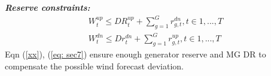\textbf{\emph{Reserve constraints:} }
\begin{align}
W^{up}_t \leq DR^{up}_t + \sum_{g=1}^{G} r_{g,t}^{dn}, t\in{1,...,T} \label{xx} \\
W^{dn}_t \leq Dr^{dn}_t + \sum_{g=1}^{G} r_{g,t}^{up}, t\in{1,...,T} \label{eq: sec7} 
\end{align}
Eqn (\ref{xx}), (\ref{eq: sec7}) ensure enough generator reserve and MG DR to compensate the possible wind forecast deviation. 


